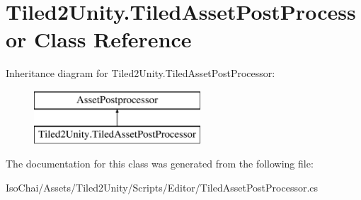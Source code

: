\hypertarget{class_tiled2_unity_1_1_tiled_asset_post_processor}{}\section{Tiled2\+Unity.\+Tiled\+Asset\+Post\+Processor Class Reference}
\label{class_tiled2_unity_1_1_tiled_asset_post_processor}
Inheritance diagram for Tiled2\+Unity.\+Tiled\+Asset\+Post\+Processor\+:\begin{figure}[H]
\begin{center}
\leavevmode
\includegraphics[height=2.000000cm]{class_tiled2_unity_1_1_tiled_asset_post_processor}
\end{center}
\end{figure}


The documentation for this class was generated from the following file\+:\begin{DoxyCompactItemize}
\item 
Iso\+Chai/\+Assets/\+Tiled2\+Unity/\+Scripts/\+Editor/Tiled\+Asset\+Post\+Processor.\+cs\end{DoxyCompactItemize}
